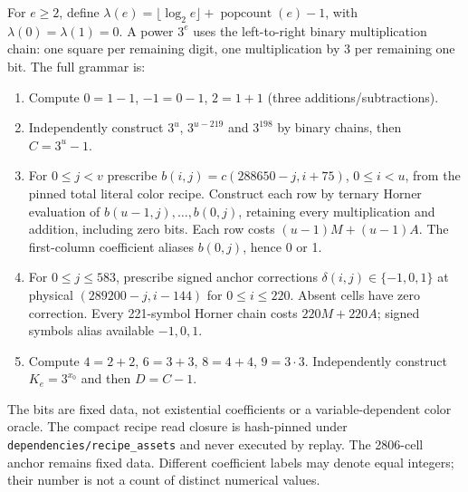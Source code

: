\documentclass[11pt,letterpaper]{article}
\theoremstyle{definition}\newtheorem{definition}[theorem]{Definition}
\theoremstyle{remark}\newtheorem{remark}[theorem]{Remark}
\newcommand{\codeu}[1]{\nolinkurl{#1}}
\begin{document}
For $e\ge2$, define $\lambda(e)=\lfloor\log_2e\rfloor+\operatorname{popcount}(e)-1$, with $\lambda(0)=\lambda(1)=0$. A power $3^e$ uses the left-to-right binary multiplication chain: one square per remaining digit, one multiplication by 3 per remaining one bit. The full grammar is:
\begin{enumerate}
\item Compute $0=1-1$, $-1=0-1$, $2=1+1$ (three additions/subtractions).
\item Independently construct $3^u$, $3^{u-219}$ and $3^{198}$ by binary chains, then $C=3^u-1$.
\item For $0\le j<v$ prescribe $b(i,j)=c(288650-j,i+75)$, $0\le i<u$, from the pinned total literal color recipe. Construct each row by ternary Horner evaluation of $b(u-1,j),\ldots,b(0,j)$, retaining every multiplication and addition, including zero bits. Each row costs $(u-1)M+(u-1)A$. The first-column coefficient aliases $b(0,j)$, hence 0 or 1.
\item For $0\le j\le583$, prescribe signed anchor corrections $\delta(i,j)\in\{-1,0,1\}$ at physical $(289200-j,i-144)$ for $0\le i\le220$. Absent cells have zero correction. Every 221-symbol Horner chain costs $220M+220A$; signed symbols alias available $-1,0,1$.
\item Compute $4=2+2$, $6=3+3$, $8=4+4$, $9=3\cdot3$. Independently construct $K_e=3^{x_0}$ and then $D=C-1$.
\end{enumerate}
The bits are fixed data, not existential coefficients or a variable-dependent color oracle. The compact recipe read closure is hash-pinned under \codeu{dependencies/recipe_assets} and never executed by replay. The 2806-cell anchor remains fixed data. Different coefficient labels may denote equal integers; their number is not a count of distinct numerical values.
\end{document}
